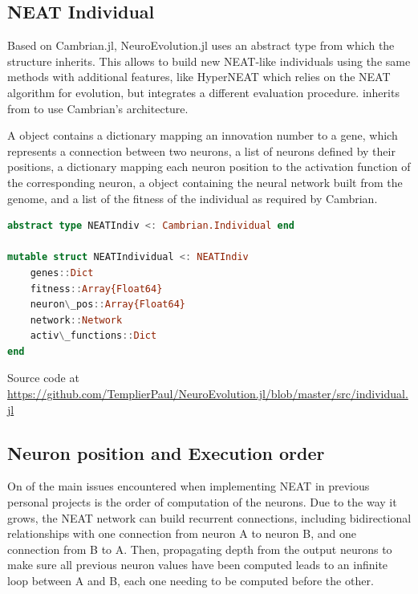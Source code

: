 \subsection{NEAT Individual}

Based on Cambrian.jl, NeuroEvolution.jl uses an abstract type  from which the structure  inherits. This allows to build new NEAT-like individuals using the same methods with additional features, like HyperNEAT which relies on the NEAT algorithm for evolution, but integrates a different evaluation procedure.  inherits from  to use Cambrian's architecture.

A  object contains a dictionary mapping an innovation number to a gene, which represents a connection between two neurons, a list of neurons defined by their positions, a dictionary mapping each neuron position to the activation function of the corresponding neuron, a  object containing the neural network built from the genome, and a list of the fitness of the individual as required by Cambrian.

\begin{minipage}{\linewidth}
\begin{lstlisting}[language=Julia, caption=NEAT Individual]
abstract type NEATIndiv <: Cambrian.Individual end

mutable struct NEATIndividual <: NEATIndiv
    genes::Dict
    fitness::Array{Float64}
    neuron\_pos::Array{Float64}
    network::Network
    activ\_functions::Dict
end
\end{lstlisting}
Source code at \url{https://github.com/TemplierPaul/NeuroEvolution.jl/blob/master/src/individual.jl}\\
\end{minipage}

\subsection{Neuron position and Execution order}
\label{subsec:NEAT_neur_pos}

On of the main issues encountered when implementing NEAT in previous personal projects is the order of computation of the neurons. Due to the way it grows, the NEAT network can build recurrent connections, including bidirectional relationships with one connection from neuron A to neuron B, and one connection from B to A. Then, propagating depth from the output neurons to make sure all previous neuron values have been computed leads to an infinite loop between A and B, each one needing to be computed before the other. 

